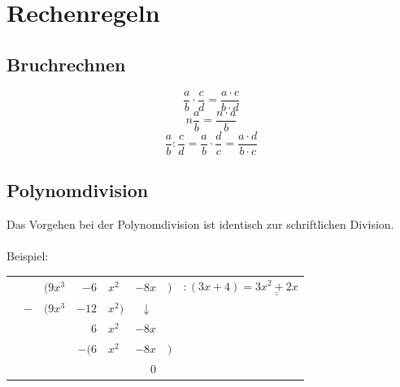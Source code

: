 



\section{Rechenregeln}
\subsection{Bruchrechnen}
\[ \boxed{\frac{a}{b} \cdot \frac{c}{d} = \frac{a \cdot c}{b \cdot d}} \]
\[ \boxed{n \frac{a}{b} = \frac{n \cdot a}{b}} \]
\[ \boxed{\frac{a}{b} : \frac{c}{d} = \frac{a}{b} \cdot \frac{d}{c} 
= \frac{a \cdot d}{b \cdot c}} \]

\subsection{Polynomdivision}
Das Vorgehen bei der Polynomdivision ist identisch zur schriftlichen 
Division. \\\\
Beispiel: 

\begin{tabular}{|r@{}r@{}r@{}r@{}l@{}r@{}r@{}l|}
\hline
\rule{0pt}{12pt}&&$(9x^3 $&$- 6$&$x^2 $&$- 8x$&$)$&$:(3x + 4) 
= \underline{\underline{3x^2 + 2x}}$\\
&$-$&$(9x^3 $&$- 12$&$x^2)$&$\downarrow\,\,$&&\\
\cline{2-5}\rule{0pt}{12pt}&&&$6$&$x^2 $&$- 8x$&&\\
&&&$-(6$&$x^2 $&$- 8x$&$)$&\\
\cline{4-7}\rule{0pt}{12pt}&&&&&$0$&&\\
\hline
\end{tabular}


